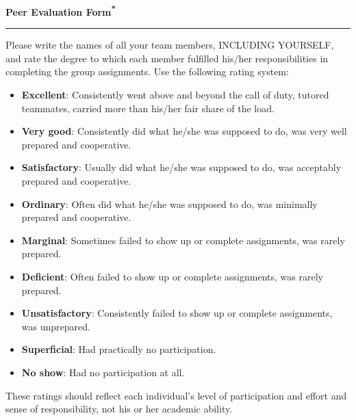 \documentclass{article}
\begin{document}
\begin{center}
  {\Huge\bfseries Peer Evaluation Form\textsuperscript{*}} %
  \vspace{0.5cm}

  \hrule %
  \vspace{0.5cm}
\end{center}

Please write the names of all your team members, INCLUDING YOURSELF, and rate the degree
to which each member fulfilled his/her responsibilities in completing the group assignments.
Use the following rating system:

\begin{itemize}[leftmargin=*, label=\textbullet]
    \item \textbf{Excellent}: Consistently went above and beyond the call of duty, tutored teammates, carried more than his/her fair share of the load.
    \item \textbf{Very good}: Consistently did what he/she was supposed to do, was very well prepared and cooperative.
    \item \textbf{Satisfactory}: Usually did what he/she was supposed to do, was acceptably prepared and cooperative.
    \item \textbf{Ordinary}: Often did what he/she was supposed to do, was minimally prepared and cooperative.
    \item \textbf{Marginal}: Sometimes failed to show up or complete assignments, was rarely prepared.
    \item \textbf{Deficient}: Often failed to show up or complete assignments, was rarely prepared.
    \item \textbf{Unsatisfactory}: Consistently failed to show up or complete assignments, was unprepared.
    \item \textbf{Superficial}: Had practically no participation.
    \item \textbf{No show}: Had no participation at all.
\end{itemize}

\vspace{0.5cm}

These ratings should reflect each individual's level of participation and effort and sense of responsibility, not his or her academic ability.

\vspace{0.5cm}
\end{document}
